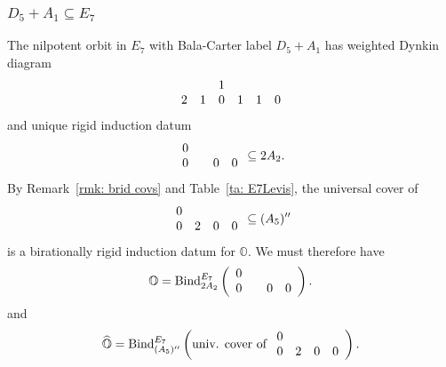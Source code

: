 \documentclass[11pt]{amsart}
\renewcommand{\O}{{\mathbb O}}
\newcommand{\bZ}{{\mathbb Z}}
\newcommand{\BInd}{{{\mbox{\rm Bind}}}}
\newcommand{\hatO}{\widehat{\O}}
\numberwithin{equation}{section}
\begin{document}
	\subsubsection{\texorpdfstring{$D_5+A_1\subseteq E_7$}{D5A1 in E7}}\label{sss: D5A1 in E7}
	
	The nilpotent orbit in $E_7$ with Bala-Carter label $D_5+A_1$ has weighted Dynkin diagram $$\begin{array}{c c c c c c}
		& & 1 & & & \\
		2 & 1 & 0 & 1 & 1 & 0 \\
	\end{array}$$ and unique rigid induction datum
	$$\begin{array}{c c c c}
		0 & & & \\
		0 & & 0 & 0 \\
	\end{array}\subseteq 2 A_2.$$ By Remark~\ref{rmk: brid covs} and Table~\ref{ta: E7Levis}, the universal cover of $$\begin{array}{c c c c}
	0 & & & \\
	  0 & 2 & 0 & 0 \\
	\end{array}\subseteq (A_5)''$$ is a birationally rigid induction datum for $\O$. We must therefore have
	$$\O = \BInd_{2A_2}^{E_7}\left(\begin{array}{c c c c}
		0 & & & \\
		0 & & 0 & 0 \\
	\end{array} \right).$$
	and
	$$\hatO = \BInd_{(A_5)''}^{E_7}\left( \mbox{univ. cover of }\begin{array}{c c c c}
	0 & & & \\
	0 & 2 & 0 & 0 \\
	\end{array} \right).$$
	

	
\end{document}
